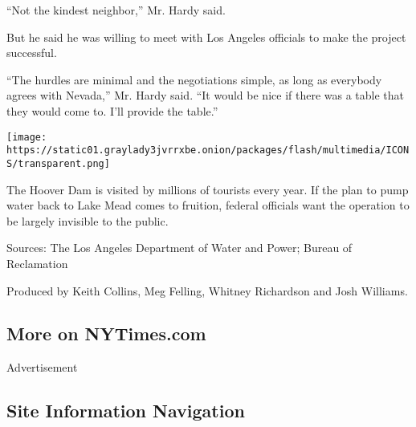 ``Not the kindest neighbor,'' Mr. Hardy said.

But he said he was willing to meet with Los Angeles officials to make
the project successful.

``The hurdles are minimal and the negotiations simple, as long as
everybody agrees with Nevada,'' Mr. Hardy said. ``It would be nice if
there was a table that they would come to. I'll provide the table.''

\texttt{[image: https://static01.graylady3jvrrxbe.onion/packages/flash/multimedia/ICONS/transparent.png]}

The Hoover Dam is visited by millions of tourists every year. If the
plan to pump water back to Lake Mead comes to fruition, federal
officials want the operation to be largely invisible to the public.

Sources: The Los Angeles Department of Water and Power; Bureau of
Reclamation

Produced by Keith Collins, Meg Felling, Whitney Richardson and Josh
Williams.

\hypertarget{more-on-nytimescom}{%
\subsection{More on NYTimes.com}\label{more-on-nytimescom}}

Advertisement

\hypertarget{site-information-navigation}{%
\subsection{Site Information
Navigation}\label{site-information-navigation}}

